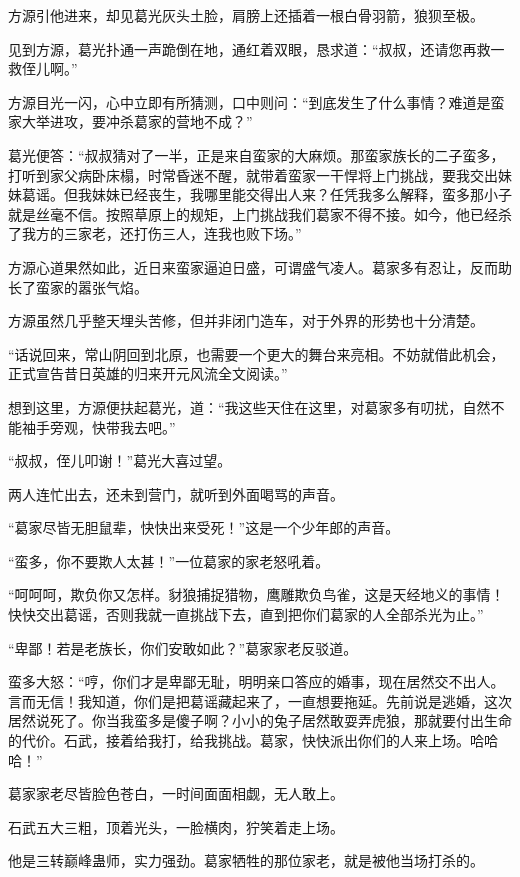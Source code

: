\begin{this_body}
方源引他进来，却见葛光灰头土脸，肩膀上还插着一根白骨羽箭，狼狈至极。

见到方源，葛光扑通一声跪倒在地，通红着双眼，恳求道：“叔叔，还请您再救一救侄儿啊。”

方源目光一闪，心中立即有所猜测，口中则问：“到底发生了什么事情？难道是蛮家大举进攻，要冲杀葛家的营地不成？”

葛光便答：“叔叔猜对了一半，正是来自蛮家的大麻烦。那蛮家族长的二子蛮多，打听到家父病卧床榻，时常昏迷不醒，就带着蛮家一干悍将上门挑战，要我交出妹妹葛谣。但我妹妹已经丧生，我哪里能交得出人来？任凭我多么解释，蛮多那小子就是丝毫不信。按照草原上的规矩，上门挑战我们葛家不得不接。如今，他已经杀了我方的三家老，还打伤三人，连我也败下场。”

方源心道果然如此，近日来蛮家逼迫日盛，可谓盛气凌人。葛家多有忍让，反而助长了蛮家的嚣张气焰。

方源虽然几乎整天埋头苦修，但并非闭门造车，对于外界的形势也十分清楚。

“话说回来，常山阴回到北原，也需要一个更大的舞台来亮相。不妨就借此机会，正式宣告昔日英雄的归来开元风流全文阅读。”

想到这里，方源便扶起葛光，道：“我这些天住在这里，对葛家多有叨扰，自然不能袖手旁观，快带我去吧。”

“叔叔，侄儿叩谢！”葛光大喜过望。

两人连忙出去，还未到营门，就听到外面喝骂的声音。

“葛家尽皆无胆鼠辈，快快出来受死！”这是一个少年郎的声音。

“蛮多，你不要欺人太甚！”一位葛家的家老怒吼着。

“呵呵呵，欺负你又怎样。豺狼捕捉猎物，鹰雕欺负鸟雀，这是天经地义的事情！快快交出葛谣，否则我就一直挑战下去，直到把你们葛家的人全部杀光为止。”

“卑鄙！若是老族长，你们安敢如此？”葛家家老反驳道。

蛮多大怒：“哼，你们才是卑鄙无耻，明明亲口答应的婚事，现在居然交不出人。言而无信！我知道，你们是把葛谣藏起来了，一直想要拖延。先前说是逃婚，这次居然说死了。你当我蛮多是傻子啊？小小的兔子居然敢耍弄虎狼，那就要付出生命的代价。石武，接着给我打，给我挑战。葛家，快快派出你们的人来上场。哈哈哈！”

葛家家老尽皆脸色苍白，一时间面面相觑，无人敢上。

石武五大三粗，顶着光头，一脸横肉，狞笑着走上场。

他是三转巅峰蛊师，实力强劲。葛家牺牲的那位家老，就是被他当场打杀的。


\end{this_body}
